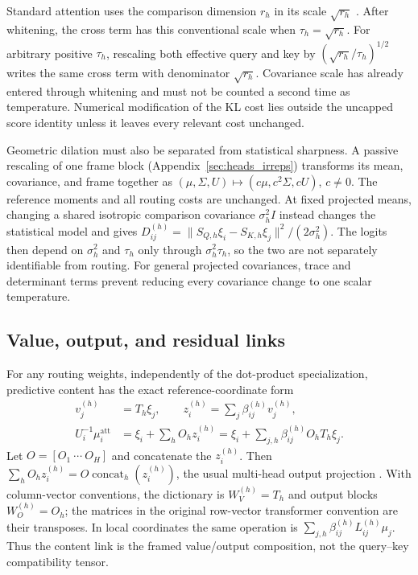 \documentclass[twoside,11pt]{article}
\begin{document}
Standard attention uses the comparison dimension \(r_h\) in its scale \(\sqrt{r_h}\) \citep[Sec.~3.2.1]{vaswani2017attention}. After whitening, the cross term has this conventional scale when \(\tau_h=\sqrt{r_h}\). For arbitrary positive \(\tau_h\), rescaling both effective query and key by \((\sqrt{r_h}/\tau_h)^{1/2}\) writes the same cross term with denominator \(\sqrt{r_h}\). Covariance scale has already entered through whitening and must not be counted a second time as temperature. Numerical modification of the KL cost lies outside the uncapped score identity unless it leaves every relevant cost unchanged.

Geometric dilation must also be separated from statistical sharpness. A passive rescaling of one frame block (Appendix~\ref{sec:heads_irreps}) transforms its mean, covariance, and frame together as $(\mu,\Sigma,U)\mapsto(c\mu,c^2\Sigma,cU)$, $c\ne0$. The reference moments and all routing costs are unchanged. At fixed projected means, changing a shared isotropic comparison covariance $\sigma_h^2I$ instead changes the statistical model and gives $D_{ij}^{(h)}=\|S_{Q,h}\xi_i-S_{K,h}\xi_j\|^2/(2\sigma_h^2)$. The logits then depend on $\sigma_h^2$ and $\tau_h$ only through $\sigma_h^2\tau_h$, so the two are not separately identifiable from routing. For general projected covariances, trace and determinant terms prevent reducing every covariance change to one scalar temperature.

\subsection{Value, output, and residual links}
\label{sec:value_aggregation}

For any routing weights, independently of the dot-product specialization, predictive content has the exact reference-coordinate form
\begin{align}
v_j^{(h)}&=T_h\xi_j,\qquad
z_i^{(h)}=\sum_j\beta_{ij}^{(h)}v_j^{(h)},\\
U_i^{-1}\mu_i^{\mathrm{att}}
&=\xi_i+\sum_hO_hz_i^{(h)}
=\xi_i+\sum_{j,h}\beta_{ij}^{(h)}O_hT_h\xi_j.
\label{eq:projected_transformer_residual}
\end{align}
Let $O=[O_1\ \cdots\ O_H]$ and concatenate the $z_i^{(h)}$. Then $\sum_hO_hz_i^{(h)}=O\operatorname{concat}_h(z_i^{(h)})$, the usual multi-head output projection \citep[Sec.~3.2.2]{vaswani2017attention}. With column-vector conventions, the dictionary is $W_V^{(h)}=T_h$ and output blocks $W_O^{(h)}=O_h$; the matrices in the original row-vector transformer convention are their transposes. In local coordinates the same operation is $\sum_{j,h}\beta_{ij}^{(h)}L_{ij}^{(h)}\mu_j$. Thus the content link is the framed value/output composition, not the query--key compatibility tensor.
\end{document}
